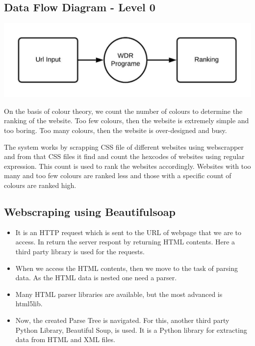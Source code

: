 \documentclass{fisatproject}
\begin{document}
\subsection{Data Flow Diagram - Level 0}
\begin{flushleft}
	\centerline{\includegraphics[scale=1.2]{image/level_0_dfd.jpeg}}
\end{flushleft}

On the basis of colour theory, we count the number of colours to determine the ranking of the website.
Too few colours, then the website is extremely simple and too boring.
Too many colours, then the website is over-designed and busy.

The system works by scrapping CSS file of different websites using webscrapper and from that CSS files it find and count the hexcodes of websites using regular expression. This count is used to rank the websites accordingly. Websites with too many and too few colours are ranked less and those with a specific count of colours are ranked high.  
  \subsection{Webscraping using Beautifulsoap}
  \begin{itemize}
 \item It is an HTTP request which is sent to the URL of webpage that we are to access. In return the server respont by returning HTML contents. Here a third party library is used for the requests.
 \item When we access the HTML contents, then we move to the task of parsing data. As the HTML data is nested one need a parser.
 \item Many HTML parser libraries are available, but the most advanced is html5lib.
 \item Now, the created Parse Tree is navigated. For this, another third party Python Library, Beautiful Soup, is used. It is a Python library for extracting data from HTML and XML files.
  \end{itemize}
\end{document}
